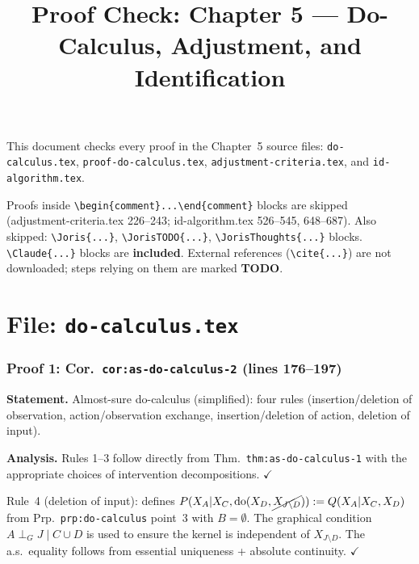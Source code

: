 \documentclass{article}
\title{Proof Check: Chapter 5 --- Do-Calculus, Adjustment, and Identification}
\date{}
\begin{document}
\maketitle

This document checks every proof in the Chapter~5 source files:
\texttt{do-calculus.tex},
\texttt{proof-do-calculus.tex},
\texttt{adjustment-criteria.tex}, and
\texttt{id-algorithm.tex}.

Proofs inside \verb|\begin{comment}...\end{comment}| blocks are skipped
(adjustment-criteria.tex 226--243; id-algorithm.tex 526--545, 648--687).
Also skipped: \verb|\Joris{...}|, \verb|\JorisTODO{...}|,
\verb|\JorisThoughts{...}| blocks.
\verb|\Claude{...}| blocks are \textbf{included}.
External references (\verb|\cite{...}|) are not downloaded;
steps relying on them are marked \textbf{TODO}.

\part*{File: \texttt{do-calculus.tex}}

\section{Proof 1: Cor.\ \texttt{cor:as-do-calculus-2} (lines 176--197)}

\textbf{Statement.} Almost-sure do-calculus (simplified): four rules
(insertion/deletion of observation, action/observation exchange,
insertion/deletion of action, deletion of input).

\textbf{Analysis.}
Rules 1--3 follow directly from Thm.\ \texttt{thm:as-do-calculus-1}
with the appropriate choices of intervention decompositions.  $\checkmark$

Rule~4 (deletion of input): defines
$P(X_A|X_C,\operatorname{do}(X_D,\cancel{X_{J\setminus D}}))
 := Q(X_A|X_C,X_D)$
from Prp.\ \texttt{prp:do-calculus} point~3 with $B=\emptyset$.
The graphical condition $A \perp_G J\mid C\cup D$ is used to ensure
the kernel is independent of $X_{J\setminus D}$.
The a.s.\ equality follows from essential uniqueness + absolute continuity.
$\checkmark$
\end{document}
